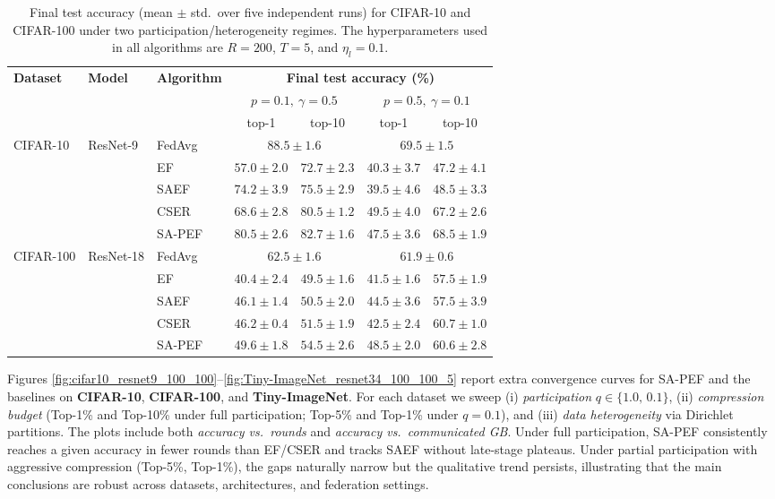 \documentclass{article} %
\begin{document}
\begin{table}[t]
\centering
\caption{Final test accuracy (mean $\pm$ std.\ over five independent runs) for CIFAR-10 and CIFAR-100 under two participation/heterogeneity regimes. The hyperparameters used in all algorithms are $R=200$, $T=5$, and $\eta_l=0.1$.}
\label{tab:error_bar}
\begin{tabular}{lllcccc}
\toprule
\multirow{3}{*}{\textbf{Dataset}} & \multirow{3}{*}{\textbf{Model}} & \multirow{3}{*}{\textbf{Algorithm}} & \multicolumn{4}{c}{\textbf{Final test accuracy (\%)}} \\
 & & & \multicolumn{2}{c}{$p = 0.1,\ \gamma = 0.5$} & \multicolumn{2}{c}{$p = 0.5,\ \gamma = 0.1$} \\
 & & & top-1 & top-10 & top-1 & top-10 \\
\midrule
\multirow{5}{*}{CIFAR-10} & \multirow{5}{*}{ResNet-9} 
  & FedAvg  & \multicolumn{2}{c}{$88.5 \pm 1.6$} & \multicolumn{2}{c}{$69.5 \pm 1.5$} \\
 & & EF      & $57.0 \pm 2.0$ & $72.7 \pm 2.3$ & $40.3 \pm 3.7$ & $47.2 \pm 4.1$ \\
 & & SAEF    & $74.2 \pm 3.9$ & $75.5 \pm 2.9$ & $39.5 \pm 4.6$ & $48.5 \pm 3.3$ \\
 & & CSER    & $68.6 \pm 2.8$ & $80.5 \pm 1.2$ & $49.5 \pm 4.0$ & $67.2 \pm 2.6$ \\
 & & SA-PEF  & $80.5 \pm 2.6$ & $82.7 \pm 1.6$ & $47.5 \pm 3.6$ & $68.5 \pm 1.9$ \\
\midrule
\multirow{5}{*}{CIFAR-100} & \multirow{5}{*}{ResNet-18} 
  & FedAvg  & \multicolumn{2}{c}{$62.5 \pm 1.6$} & \multicolumn{2}{c}{$61.9 \pm 0.6$} \\
 & & EF      & $40.4 \pm 2.4$ & $49.5 \pm 1.6$ & $41.5 \pm 1.6$ & $57.5 \pm 1.9$ \\
 & & SAEF    & $46.1 \pm 1.4$ & $50.5 \pm 2.0$ & $44.5 \pm 3.6$ & $57.5 \pm 3.9$ \\
 & & CSER    & $46.2 \pm 0.4$ & $51.5 \pm 1.9$ & $42.5 \pm 2.4$ & $60.7 \pm 1.0$ \\
 & & SA-PEF  & $49.6 \pm 1.8$ & $54.5 \pm 2.6$ & $48.5 \pm 2.0$ & $60.6 \pm 2.8$ \\
\bottomrule
\end{tabular}
\end{table}

Figures \ref{fig:cifar10_resnet9_100_100}--\ref{fig:Tiny-ImageNet_resnet34_100_100_5} report extra convergence curves for SA-PEF and the baselines on \textbf{CIFAR-10}, \textbf{CIFAR-100}, and \textbf{Tiny-ImageNet}. For each dataset we sweep (i) \emph{participation} \(q\in\{1.0,\,0.1\}\), (ii) \emph{compression budget} (Top-1\% and Top-10\% under full participation; Top-5\% and Top-1\% under \(q{=}0.1\)), and (iii) \emph{data heterogeneity} via Dirichlet partitions. The plots include both \emph{accuracy vs.\ rounds} and \emph{accuracy vs.\ communicated GB}. Under full participation, SA-PEF consistently reaches a given accuracy in fewer rounds than EF/CSER and tracks SAEF without late-stage plateaus. Under partial participation with aggressive compression (Top-5\%, Top-1\%), the gaps naturally narrow but the qualitative trend persists, illustrating that the main conclusions are robust across datasets, architectures, and federation settings.
\end{document}
